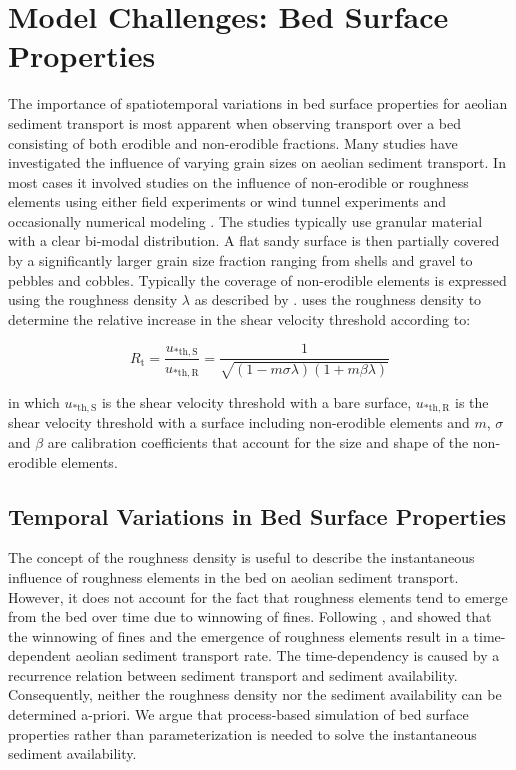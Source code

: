 \section{Model Challenges: Bed Surface Properties} \label{sec:challenges}

The importance of spatiotemporal variations in bed surface properties
for aeolian sediment transport is most apparent when observing
transport over a bed consisting of both erodible and non-erodible
fractions. Many studies have investigated the influence of varying
grain sizes on aeolian sediment transport. In most cases it involved
studies on the influence of non-erodible or roughness elements using
either field experiments \citep[e.g.][]{DavidsonArnott1997,
  Gillies2006, Tan2013} or wind tunnel experiments
\citep[e.g.][]{Gillette1989, Nickling1995, McKennaNeuman1995,
  Dong2004b, McKennaNeuman2012} and occasionally numerical modeling
\citep[e.g.][]{Turpin2010}. The studies typically use granular
material with a clear bi-modal distribution. A flat sandy surface is
then partially covered by a significantly larger grain size fraction
ranging from shells and gravel to pebbles and cobbles. Typically the
coverage of non-erodible elements is expressed using the roughness
density $\lambda$ as described by
\citet{Raupach1993}. \citet{Raupach1993} uses the roughness density to
determine the relative increase in the shear velocity threshold
according to:

\begin{equation} \label{eq:raupach}
R_{\mathrm{t}} = \frac{u_{\mathrm{* th, S}}}{u_{\mathrm{* th, R}}} = \frac{1}{\sqrt{(1 - m \sigma \lambda) (1 + m \beta \lambda)}}
\end{equation}

\noindent in which $u_{\mathrm{* th, S}}$ is the shear velocity
threshold with a bare surface, $u_{\mathrm{* th, R}}$ is the shear
velocity threshold with a surface including non-erodible elements and
$m$, $\sigma$ and $\beta$ are calibration coefficients that account
for the size and shape of the non-erodible elements. 

\subsection{Temporal Variations in Bed Surface Properties}

The concept of the roughness density is useful to describe the
instantaneous influence of roughness elements in the bed on aeolian
sediment transport. However, it does not account for the fact that
roughness elements tend to emerge from the bed over time due to
winnowing of fines. Following \citet{Gillette1989},
\citet{Nickling1995} and \citet{McKennaNeuman1995} showed that the
winnowing of fines and the emergence of roughness elements result in a
time-dependent aeolian sediment transport rate. The time-dependency is
caused by a recurrence relation between sediment transport and
sediment availability. Consequently, neither the roughness density nor
the sediment availability can be determined a-priori. We argue that
process-based simulation of bed surface properties rather than
parameterization is needed to solve the instantaneous sediment
availability.

